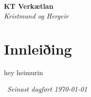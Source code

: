\documentclass[11pt]{article}
\begin{document}
\begin{titlepage}
   \begin{center}
      \Large\textbf{KT Verkætlan}\\
      \large\textit{Kristmund og Hergeir}
   \end{center}
   
\section{Innleiðing}
hey heimurin
\end{titlepage}
\begin{center}
\end{center}
\
\flushright\textit{Seinast dagført \today}
\end{document}
